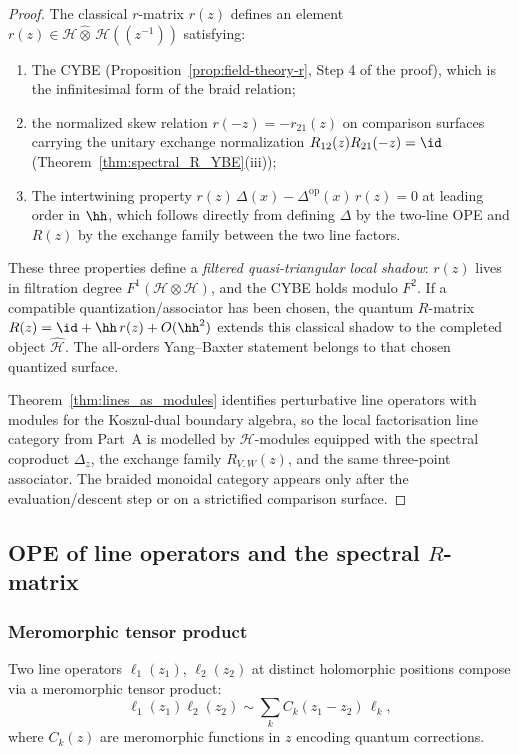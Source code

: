 \begin{proof}
The classical $r$-matrix $r(z)$ defines an element $r(z) \in \mathcal{H} \widehat{\otimes}\, \mathcal{H}((z^{-1}))$ satisfying:
\begin{enumerate}[label=(\alph*)]
\item The CYBE (Proposition~\ref{prop:field-theory-r}, Step 4 of the proof), which is the infinitesimal form of the braid relation;
\item the normalized skew relation \(r(-z)=-r_{21}(z)\) on comparison
surfaces carrying the unitary exchange normalization
\(R_{12}(z)R_{21}(-z)=\id\)
\textup{(}Theorem~\ref{thm:spectral_R_YBE}\textup{(}iii\textup{)}\textup{)};
\item The intertwining property $r(z)\,\Delta(x) - \Delta^{\mathrm{op}}(x)\,r(z) = 0$ at leading order in $\hh$, which follows directly from defining $\Delta$ by the two-line OPE and $R(z)$ by the exchange family between the two line factors.
\end{enumerate}
These three properties define a \emph{filtered quasi-triangular
local shadow}: $r(z)$ lives in filtration degree
$F^1(\mathcal{H} \otimes \mathcal{H})$, and the CYBE holds modulo
$F^2$. If a compatible quantization/associator has been chosen, the
quantum $R$-matrix $R(z) = \id + \hh\, r(z) + O(\hh^2)$ extends this
classical shadow to the completed object $\widehat{\mathcal{H}}$.
The all-orders Yang--Baxter statement belongs to that chosen quantized
surface.

Theorem~\ref{thm:lines_as_modules} identifies perturbative line
operators with modules for the Koszul-dual boundary algebra, so the
local factorisation line category from Part~A is modelled by
$\mathcal H$-modules equipped with the spectral coproduct
$\Delta_z$, the exchange family $R_{V,W}(z)$, and the same
three-point associator.  The braided monoidal category appears only
after the evaluation/descent step or on a strictified comparison
surface.
\end{proof}

\subsection{OPE of line operators and the spectral $R$-matrix}

\subsubsection{Meromorphic tensor product}

Two line operators $\ell_1(z_1)$, $\ell_2(z_2)$ at distinct holomorphic positions compose via a meromorphic tensor product:
\begin{equation}
\ell_1(z_1) \ell_2(z_2) \sim \sum_k C_k(z_1 - z_2) \, \ell_k,
\end{equation}
where $C_k(z)$ are meromorphic functions in $z$ encoding quantum corrections.

